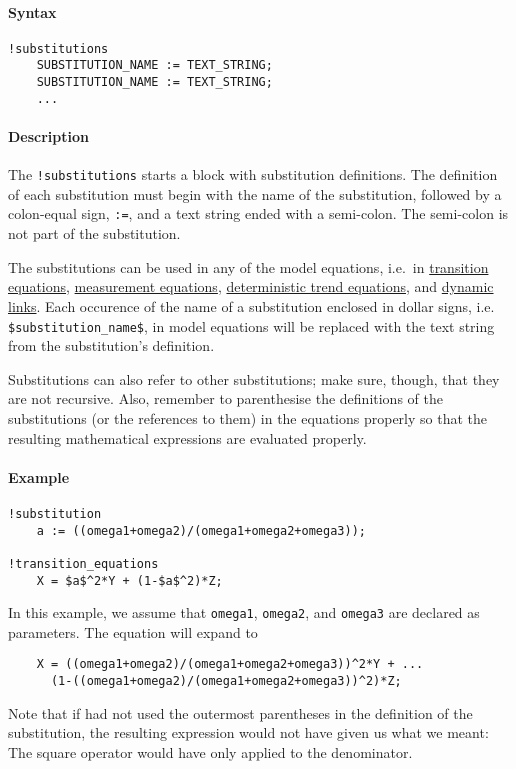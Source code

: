 


	\paragraph{Syntax}\label{syntax}

\begin{verbatim}
!substitutions
    SUBSTITUTION_NAME := TEXT_STRING;
    SUBSTITUTION_NAME := TEXT_STRING;
    ...
\end{verbatim}

\paragraph{Description}\label{description}

The \texttt{!substitutions} starts a block with substitution
definitions. The definition of each substitution must begin with the
name of the substitution, followed by a colon-equal sign, \texttt{:=},
and a text string ended with a semi-colon. The semi-colon is not part of
the substitution.

The substitutions can be used in any of the model equations, i.e.~in
\href{modellang/transitionequations}{transition equations},
\href{modellang/measurementequations}{measurement equations},
\href{modellang/dtrends}{deterministic trend equations}, and
\href{modellang/links}{dynamic links}. Each occurence of the name of a
substitution enclosed in dollar signs, i.e.
\texttt{\$substitution\_name\$}, in model equations will be replaced
with the text string from the substitution's definition.

Substitutions can also refer to other substitutions; make sure, though,
that they are not recursive. Also, remember to parenthesise the
definitions of the substitutions (or the references to them) in the
equations properly so that the resulting mathematical expressions are
evaluated properly.

\paragraph{Example}\label{example}

\begin{verbatim}
!substitution
    a := ((omega1+omega2)/(omega1+omega2+omega3));

!transition_equations
    X = $a$^2*Y + (1-$a$^2)*Z;
\end{verbatim}

In this example, we assume that \texttt{omega1}, \texttt{omega2}, and
\texttt{omega3} are declared as parameters. The equation will expand to

\begin{verbatim}
    X = ((omega1+omega2)/(omega1+omega2+omega3))^2*Y + ...
      (1-((omega1+omega2)/(omega1+omega2+omega3))^2)*Z;
\end{verbatim}

Note that if had not used the outermost parentheses in the definition of
the substitution, the resulting expression would not have given us what
we meant: The square operator would have only applied to the
denominator.


